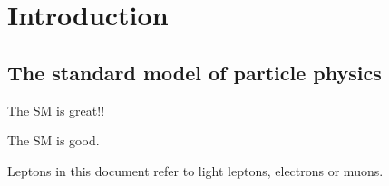 \chapter{Introduction}

\section{The standard model of particle physics}

The SM is great!!

The SM is good.

Leptons in this document refer to light leptons, electrons or muons.
